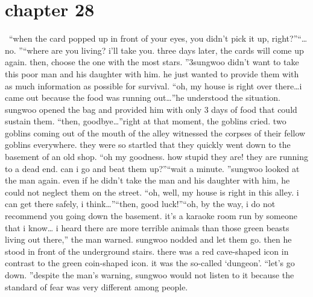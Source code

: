 \section{chapter 28}






 “when the card popped up in front of your eyes, you didn’t pick it up, right?”“… no.
”“where are you living? i’ll take you.
 three days later, the cards will come up again.
 then, choose the one with the most stars.
”3sungwoo didn’t want to take this poor man and his daughter with him.
 he just wanted to provide them with as much information as possible for survival.
“oh, my house is right over there…i came out because the food was running out…”he understood the situation.
 sungwoo opened the bag and provided him with only 3 days of food that could sustain them.
“then, goodbye…”right at that moment, the goblins cried.
two goblins coming out of the mouth of the alley witnessed the corpses of their fellow goblins everywhere.
 they were so startled that they quickly went down to the basement of an old shop.
“oh my goodness.
 how stupid they are! they are running to a dead end.
 can i go and beat them up?”“wait a minute.
”sungwoo looked at the man again.
 even if he didn’t take the man and his daughter with him, he could not neglect them on the street.
“oh, well, my house is right in this alley.
 i can get there safely, i think…”“then, good luck!”“oh, by the way, i do not recommend you going down the basement.
 it’s a karaoke room run by someone that i know… i heard there are more terrible animals than those green beasts living out there,” the man warned.
sungwoo nodded and let them go.
 then he stood in front of the underground stairs.
there was a red cave-shaped icon in contrast to the green coin-shaped icon.
 it was the so-called ‘dungeon’.
“let’s go down.
”despite the man’s warning, sungwoo would not listen to it because the standard of fear was very different among people.

